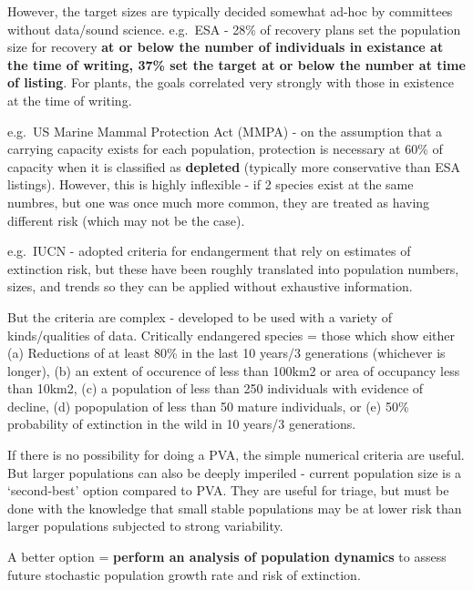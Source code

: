 \documentclass[]{article}
\begin{document}
However, the target sizes are typically decided somewhat ad-hoc by
committees without data/sound science. e.g.~ESA - 28\% of recovery plans
set the population size for recovery \textbf{at or below the number of
individuals in existance at the time of writing, 37\% set the target at
or below the number at time of listing}. For plants, the goals
correlated very strongly with those in existence at the time of writing.

e.g.~US Marine Mammal Protection Act (MMPA) - on the assumption that a
carrying capacity exists for each population, protection is necessary at
60\% of capacity when it is classified as \textbf{depleted} (typically
more conservative than ESA listings). However, this is highly inflexible
- if 2 species exist at the same numbres, but one was once much more
common, they are treated as having different risk (which may not be the
case).

e.g.~IUCN - adopted criteria for endangerment that rely on estimates of
extinction risk, but these have been roughly translated into population
numbers, sizes, and trends so they can be applied without exhaustive
information.

But the criteria are complex - developed to be used with a variety of
kinds/qualities of data. Critically endangered species = those which
show either (a) Reductions of at least 80\% in the last 10 years/3
generations (whichever is longer), (b) an extent of occurence of less
than 100km2 or area of occupancy less than 10km2, (c) a population of
less than 250 individuals with evidence of decline, (d) popopulation of
less than 50 mature individuals, or (e) 50\% probability of extinction
in the wild in 10 years/3 generations.

If there is no possibility for doing a PVA, the simple numerical
criteria are useful. But larger populations can also be deeply imperiled
- current population size is a `second-best' option compared to PVA.
They are useful for triage, but must be done with the knowledge that
small stable populations may be at lower risk than larger populations
subjected to strong variability.

A better option = \textbf{perform an analysis of population dynamics} to
assess future stochastic population growth rate and risk of extinction.
\end{document}
